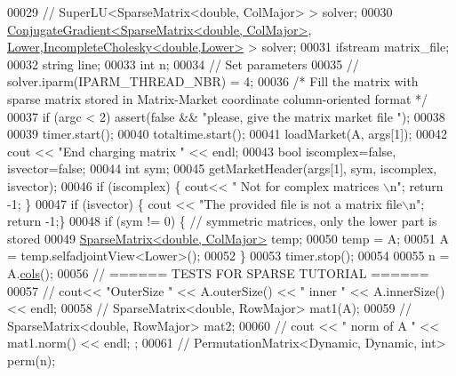 \begin{DoxyCode}
00029 \textcolor{comment}{//   SuperLU<SparseMatrix<double, ColMajor> >   solver;}
00030   \hyperlink{group___iterative_linear_solvers___module_class_eigen_1_1_conjugate_gradient}{ConjugateGradient<SparseMatrix<double, ColMajor>}, 
      \hyperlink{group__enums_gga39e3366ff5554d731e7dc8bb642f83cda891792b8ed394f7607ab16dd716f60e6}{Lower},\hyperlink{class_eigen_1_1_incomplete_cholesky}{IncompleteCholesky<double,Lower>} > solver; 
00031   ifstream matrix\_file; 
00032   \textcolor{keywordtype}{string} line;
00033   \textcolor{keywordtype}{int}  n;
00034   \textcolor{comment}{// Set parameters}
00035 \textcolor{comment}{//   solver.iparm(IPARM\_THREAD\_NBR) = 4;}
00036   \textcolor{comment}{/* Fill the matrix with sparse matrix stored in Matrix-Market coordinate column-oriented format */}
00037   \textcolor{keywordflow}{if} (argc < 2) assert(\textcolor{keyword}{false} && \textcolor{stringliteral}{"please, give the matrix market file "});
00038   
00039   timer.start();
00040   totaltime.start();
00041   loadMarket(A, args[1]);
00042   cout << \textcolor{stringliteral}{"End charging matrix "} << endl;
00043   \textcolor{keywordtype}{bool} iscomplex=\textcolor{keyword}{false}, isvector=\textcolor{keyword}{false};
00044   \textcolor{keywordtype}{int} sym;
00045   getMarketHeader(args[1], sym, iscomplex, isvector);
00046   \textcolor{keywordflow}{if} (iscomplex) \{ cout<< \textcolor{stringliteral}{" Not for complex matrices \(\backslash\)n"}; \textcolor{keywordflow}{return} -1; \}
00047   \textcolor{keywordflow}{if} (isvector) \{ cout << \textcolor{stringliteral}{"The provided file is not a matrix file\(\backslash\)n"}; \textcolor{keywordflow}{return} -1;\}
00048   \textcolor{keywordflow}{if} (sym != 0) \{ \textcolor{comment}{// symmetric matrices, only the lower part is stored}
00049     \hyperlink{group___sparse_core___module_class_eigen_1_1_sparse_matrix}{SparseMatrix<double, ColMajor>} temp; 
00050     temp = A;
00051     A = temp.selfadjointView<Lower>();
00052   \}
00053   timer.stop();
00054   
00055   n = A.\hyperlink{group___sparse_core___module_aa391750e3c530227e4a5c3c52e959975}{cols}();
00056   \textcolor{comment}{// ====== TESTS FOR SPARSE TUTORIAL ======}
00057 \textcolor{comment}{//   cout<< "OuterSize " << A.outerSize() << " inner " << A.innerSize() << endl; }
00058 \textcolor{comment}{//   SparseMatrix<double, RowMajor> mat1(A); }
00059 \textcolor{comment}{//   SparseMatrix<double, RowMajor> mat2;}
00060 \textcolor{comment}{//   cout << " norm of A " << mat1.norm() << endl; ;}
00061 \textcolor{comment}{//   PermutationMatrix<Dynamic, Dynamic, int> perm(n);}

\end{DoxyCode}
